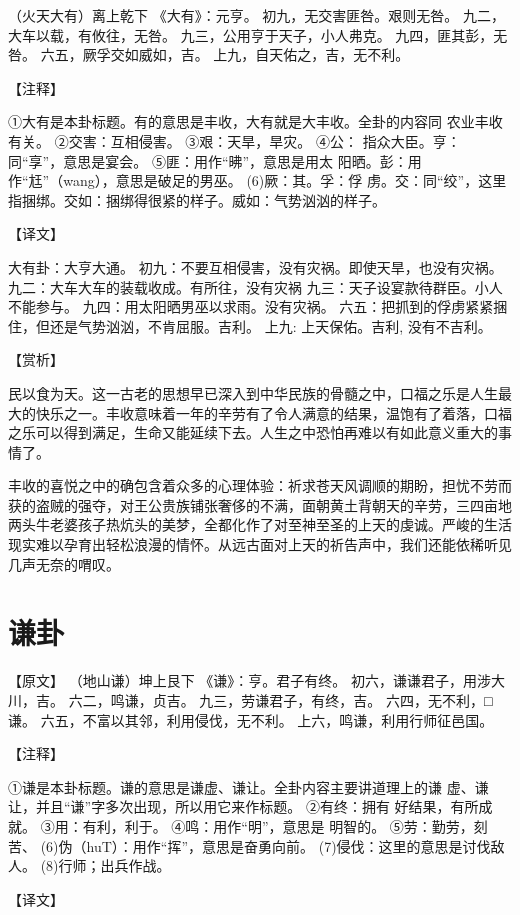 \documentclass[a4paper,12pt,UTF8,twoside]{ctexbook}
\begin{document}
（火天大有）离上乾下
《大有》：元亨。
初九，无交害匪咎。艰则无咎。
九二，大车以载，有攸往，无咎。
九三，公用亨于天子，小人弗克。
九四，匪其彭，无咎。
六五，厥孚交如威如，吉。
上九，自天佑之，吉，无不利。

【注释】

①大有是本卦标题。有的意思是丰收，大有就是大丰收。全卦的内容同 农业丰收有关。
②交害：互相侵害。
③艰：天旱，旱灾。
④公： 指众大臣。亨：同“享”，意思是宴会。
⑤匪：用作“昲”，意思是用太 阳晒。彭：用作“尪”（wang），意思是破足的男巫。
(6)厥：其。孚：俘 虏。交：同“绞”，这里指捆绑。交如：捆绑得很紧的样子。威如：气势汹汹的样子。

【译文】

大有卦：大亨大通。
初九：不要互相侵害，没有灾祸。即使天旱，也没有灾祸。
九二：大车大车的装载收成。有所往，没有灾祸
九三：天子设宴款待群臣。小人不能参与。
九四：用太阳晒男巫以求雨。没有灾祸。
六五：把抓到的俘虏紧紧捆住，但还是气势汹汹，不肯屈服。吉利。
上九: 上天保佑。吉利, 没有不吉利。

【赏析】

民以食为天。这一古老的思想早已深入到中华民族的骨髓之中，口福之乐是人生最大的快乐之一。丰收意味着一年的辛劳有了令人满意的结果，温饱有了着落，口福之乐可以得到满足，生命又能延续下去。人生之中恐怕再难以有如此意义重大的事情了。

丰收的喜悦之中的确包含着众多的心理体验：祈求苍天风调顺的期盼，担忧不劳而获的盗贼的强夺，对王公贵族铺张奢侈的不满，面朝黄土背朝天的辛劳，三四亩地两头牛老婆孩子热炕头的美梦，全都化作了对至神至圣的上天的虔诚。严峻的生活现实难以孕育出轻松浪漫的情怀。从远古面对上天的祈告声中，我们还能依稀听见几声无奈的喟叹。

\chapter{谦卦}

【原文】
（地山谦）坤上艮下
《谦》：亨。君子有终。
初六，谦谦君子，用涉大川，吉。
六二，鸣谦，贞吉。
九三，劳谦君子，有终，吉。
六四，无不利，□谦。
六五，不富以其邻，利用侵伐，无不利。
上六，鸣谦，利用行师征邑国。

【注释】

①谦是本卦标题。谦的意思是谦虚、谦让。全卦内容主要讲道理上的谦 虚、谦让，并且“谦”字多次出现，所以用它来作标题。
②有终：拥有 好结果，有所成就。
③用：有利，利于。
④鸣：用作“明”，意思是 明智的。
⑤劳：勤劳，刻苦、
(6)伪（huT）：用作“挥”，意思是奋勇向前。
(7)侵伐：这里的意思是讨伐敌人。
(8)行师；出兵作战。

【译文】
\end{document}
